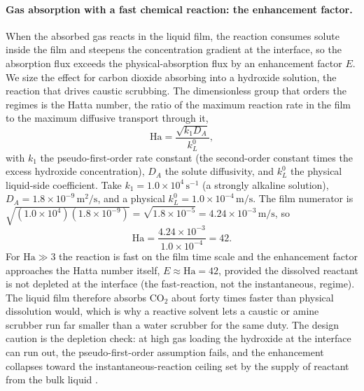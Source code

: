 \paragraph{Gas absorption with a fast chemical reaction: the enhancement
factor.} When the absorbed gas reacts in the liquid film, the reaction
consumes solute inside the film and steepens the concentration gradient
at the interface, so the absorption flux exceeds the physical-absorption
flux by an enhancement factor $E$. We size the effect for carbon dioxide
absorbing into a hydroxide solution, the reaction that drives caustic
scrubbing. The dimensionless group that orders the regimes is the Hatta
number, the ratio of the maximum reaction rate in the film to the maximum
diffusive transport through it,
\[
\text{Ha} = \frac{\sqrt{k_1 D_A}}{k_L^0},
\]
with $k_1$ the pseudo-first-order rate constant (the second-order
constant times the excess hydroxide concentration), $D_A$ the solute
diffusivity, and $k_L^0$ the physical liquid-side coefficient. Take
$k_1 = 1.0\times 10^{4}\,\text{s}^{-1}$ (a strongly alkaline solution),
$D_A = 1.8\times 10^{-9}\,\si{\meter\squared\per\second}$, and a physical
$k_L^0 = 1.0\times 10^{-4}\,\text{m/s}$. The film numerator is
$\sqrt{(1.0\times 10^{4})(1.8\times 10^{-9})} = \sqrt{1.8\times 10^{-5}}
= 4.24\times 10^{-3}\,\text{m/s}$, so
\[
\text{Ha} = \frac{4.24\times 10^{-3}}{1.0\times 10^{-4}} = 42.
\]
For $\text{Ha} \gg 3$ the reaction is fast on the film time scale and the
enhancement factor approaches the Hatta number itself, $E \approx
\text{Ha} = 42$, provided the dissolved reactant is not depleted at the
interface (the fast-reaction, not the instantaneous, regime). The liquid
film therefore absorbs $\text{CO}_2$ about forty times faster than
physical dissolution would, which is why a reactive solvent lets a
caustic or amine scrubber run far smaller than a water scrubber for the
same duty. The design caution is the depletion check: at high gas
loading the hydroxide at the interface can run out, the pseudo-first-order
assumption fails, and the enhancement collapses toward the
instantaneous-reaction ceiling set by the supply of reactant from the
bulk liquid \cite{text:treybal-mass-transfer}.

